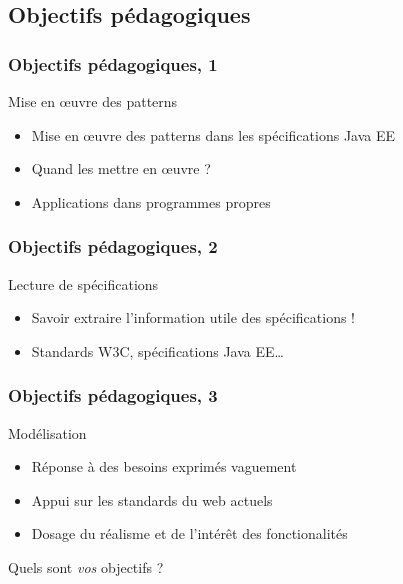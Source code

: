 \documentclass[english, french]{beamer}
\begin{document}
\subsection{Objectifs pédagogiques}
\begin{frame}
	\frametitle{Objectifs pédagogiques, 1}
	\begin{block}{Mise en œuvre des patterns}
		\begin{itemize}
		\item Mise en œuvre des patterns dans les spécifications Java EE
		\item Quand les mettre en œuvre ?
		\item Applications dans programmes propres
		\end{itemize}
	\end{block}
\end{frame}

\begin{frame}
	\frametitle{Objectifs pédagogiques, 2}
	\begin{block}{Lecture de spécifications}
		\begin{itemize}
		\item Savoir extraire l’information utile des spécifications !
		\item Standards W3C, spécifications Java EE…
		\end{itemize}
	\end{block}
\end{frame}

\begin{frame}
	\frametitle{Objectifs pédagogiques, 3}
	\begin{block}{Modélisation}
		\begin{itemize}
		\item Réponse à des besoins exprimés vaguement
		\item Appui sur les standards du web actuels
		\item Dosage du réalisme et de l’intérêt des fonctionalités
		\end{itemize}
	\end{block}
	Quels sont \emph{vos} objectifs ?
\end{frame}
\end{document}
